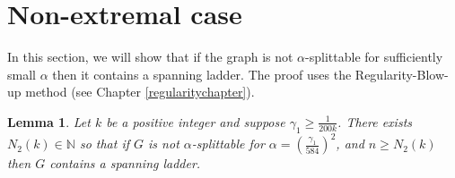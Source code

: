 \documentclass[oneside,12pt]{memoir}
\newtheorem{lemma}[theorem]{Lemma}
\newcommand{\ep}{\epsilon}
\newcommand{\g}{\gamma}
\begin{document}
% 
% 
% 
% 


\section{Non-extremal case}

In this section, we will show that if the graph is not $\alpha$-splittable
for sufficiently small $\alpha$ then it contains a spanning ladder.
The proof uses the Regularity-Blow-up method (see Chapter \ref{regularitychapter}).

\begin{lemma}\label{nonext} Let $k$ be a positive integer and suppose
$\g_{1}\geq\frac{1}{200k}$. There exists $N_{2}(k)\in \mathbb{N}$ so that if $G$
is not $\alpha$-splittable for $\alpha=\left(\frac{\g_{1}}{584}\right)^{2}$,
and $n\geq N_{2}(k)$ then $G$ contains a spanning ladder. 
\end{lemma}
\end{document}
